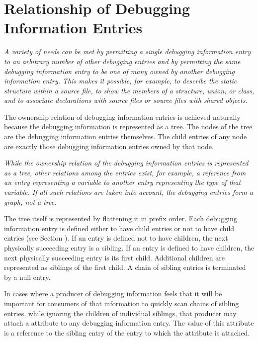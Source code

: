 \section{Relationship of Debugging Information Entries}
\label{chap:relationshipofdebugginginformationentries}
\textit{%
A variety of needs can be met by permitting a single
debugging information entry to  an arbitrary number
of other debugging entries and by permitting the same debugging
information entry to be one of many owned by another debugging
information entry. 
This makes it possible, for example, to
describe the static  structure 
within a source file,
to show the members of a structure, union, or class, and to
associate declarations with source files or source files
with shared objects.  
}


The ownership relation 
of debugging
information entries is achieved naturally because the debugging
information is represented as a tree. 
The nodes of the tree
are the debugging information entries themselves. 
The child
entries of any node are exactly those debugging information
entries owned by that node.  

\textit{%
While the ownership relation
of the debugging information entries is represented as a
tree, other relations among the entries exist, for example,
a reference from an entry representing a variable to another
entry representing the type of that variable. 
If all such
relations are taken into account, the debugging entries
form a graph, not a tree.  
}

The tree itself is represented
by flattening it in prefix order. 
Each debugging information
entry is defined either to have child entries or not to have
child entries (see Section ). 
If an entry is defined not
to have children, the next physically succeeding entry is a
sibling. 
If an entry is defined to have children, the next
physically succeeding entry is its first child. 
Additional
children are represented as siblings of the first child. 
A chain of sibling entries is terminated by a null entry.

In cases where a producer of debugging information feels that
\hypertarget{chap:DWATsiblingdebugginginformationentryrelationship}{}
it will be important for consumers of that information to
quickly scan chains of sibling entries, while ignoring the
children of individual siblings, that producer may attach 
a
\DWATsibling{} attribute 
to any debugging information entry. 
The
value of this attribute is a reference to the sibling entry
of the entry to which the attribute is attached.



